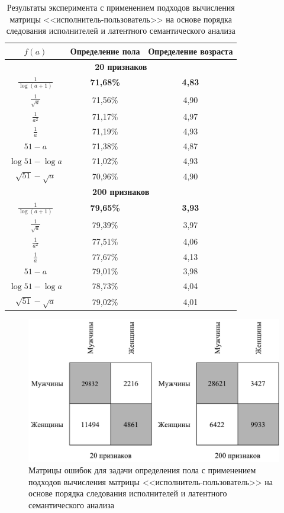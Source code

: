 \begin{table}[!h]
    \caption{Результаты эксперимента с применением подходов
             вычисления матрицы <<исполнитель-пользователь>>
             на основе порядка следования исполнителей 
             и латентного семантического анализа}
    \label{tab:order_lsa}
\centering
\begin{tabular}{|c|c|c|}\hline
    \boldmath$f(a)$ & \textbf{Определение пола} & \textbf{Определение возраста} \\\hline
    \multicolumn{3}{|c|}{\textbf{20 признаков}} \\\hline
    $\frac{1}{\log(a + 1)}$ & \textbf{71,68\%} & \textbf{4,83} \\\hline
    $\frac{1}{\sqrt{a}}$ & 71,56\% & 4,90 \\\hline
    $\frac{1}{a^2}$ & 71,17\% & 4,97 \\\hline
    $\frac{1}{a}$ & 71,19\% & 4,93 \\\hline
    $51 - a$ & 71,38\% & 4,87 \\\hline
    $\log{51} - \log{a}$ & 71,02\% & 4,93 \\\hline
    $\sqrt{51} - \sqrt{a}$ & 70,96\% & 4,90 \\\hline
    \multicolumn{3}{|c|}{\textbf{200 признаков}} \\\hline
    $\frac{1}{\log(a + 1)}$ & \textbf{79,65\%} & \textbf{3,93} \\\hline
    $\frac{1}{\sqrt{a}}$ & 79,39\% & 3,97 \\\hline
    $\frac{1}{a^2}$ & 77,51\% & 4,06 \\\hline
    $\frac{1}{a}$ & 77,67\% & 4,13 \\\hline
    $51 - a$ & 79,01\% & 3,98 \\\hline
    $\log{51} - \log{a}$ & 78,73\% & 4,04 \\\hline
    $\sqrt{51} - \sqrt{a}$ & 79,02\% & 4,01 \\\hline
\end{tabular}
\end{table}

\begin{figure}[!h]
\caption{Матрицы ошибок для задачи определения пола с
         применением подходов вычисления матрицы 
         <<исполнитель-пользователь>> на основе порядка следования
         исполнителей и латентного семантического анализа}
\label{fig:order_lsa_conf}
\centering
\includegraphics[scale=0.75]{figs/order-lsa-confusion.pdf}
\end{figure}

